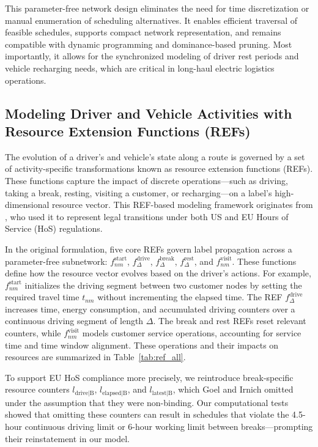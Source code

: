 \documentclass[trsc,dblanonrev]{informs4}
\begin{document}
This parameter-free network design eliminates the need for time discretization or manual enumeration of scheduling alternatives. It enables efficient traversal of feasible schedules, supports compact network representation, and remains compatible with dynamic programming and dominance-based pruning. Most importantly, it allows for the synchronized modeling of driver rest periods and vehicle recharging needs, which are critical in long-haul electric logistics operations.

\subsection{Modeling Driver and Vehicle Activities with Resource Extension Functions (REFs)}\label{sec:REFs}

The evolution of a driver’s and vehicle’s state along a route is governed by a set of activity-specific transformations known as resource extension functions (REFs). These functions capture the impact of discrete operations—such as driving, taking a break, resting, visiting a customer, or recharging—on a label’s high-dimensional resource vector. This REF-based modeling framework originates from \citet{goel2017exact}, who used it to represent legal transitions under both US and EU Hours of Service (HoS) regulations.

In the original formulation, five core REFs govern label propagation across a parameter-free subnetwork: \( f^{\text{start}}_{nm} \), \( f^{\text{drive}}_{\Delta} \), \( f^{\text{break}}_{\Delta} \), \( f^{\text{rest}}_{\Delta} \), and \( f^{\text{visit}}_{nm} \). These functions define how the resource vector evolves based on the driver's actions. For example, \( f^{\text{start}}_{nm} \) initializes the driving segment between two customer nodes by setting the required travel time \( t_{nm} \) without incrementing the elapsed time. The REF \( f^{\text{drive}}_{\Delta} \) increases time, energy consumption, and accumulated driving counters over a continuous driving segment of length \( \Delta \). The break and rest REFs reset relevant counters, while \( f^{\text{visit}}_{nm} \) models customer service operations, accounting for service time and time window alignment. These operations and their impacts on resources are summarized in Table~\ref{tab:ref_all}.

To support EU HoS compliance more precisely, we reintroduce break-specific resource counters \( l_{\text{drive|B}} \), \( l_{\text{elapsed|B}} \), and \( l_{\text{latest|B}} \), which Goel and Irnich omitted under the assumption that they were non-binding. Our computational tests showed that omitting these counters can result in schedules that violate the 4.5-hour continuous driving limit or 6-hour working limit between breaks—prompting their reinstatement in our model.
\end{document}
